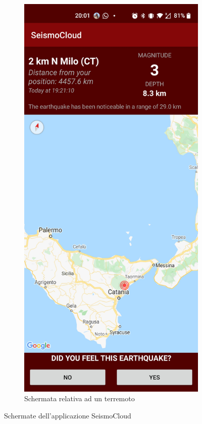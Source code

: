 \begin{figure}[h]
\begin{subfigure}{0.5\textwidth}
\label{fig:application}
\end{subfigure}
\begin{subfigure}{0.5\textwidth}
\includegraphics[width=0.9\linewidth]{images/applicationsurvey.png}
\caption{Schermata relativa ad un terremoto}
\label{fig:applicationsurvey}
\end{subfigure}

\caption{Schermate dell'applicazione SeismoCloud}
\label{fig:schermate}
\end{figure}

